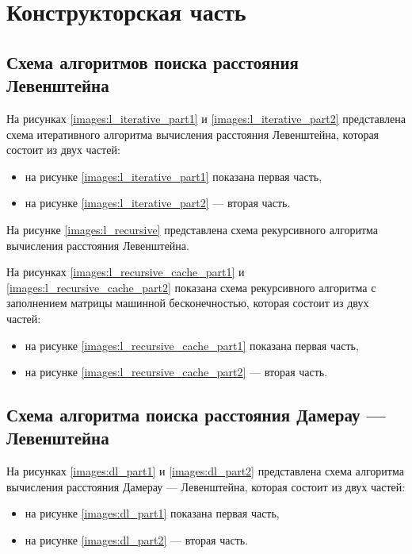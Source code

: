 \chapter{Конструкторская часть}

\section{Схема алгоритмов поиска расстояния Левенштейна}

На рисунках \ref{images:l_iterative_part1} и \ref{images:l_iterative_part2} представлена схема итеративного алгоритма вычисления расстояния Левенштейна, которая состоит из двух частей:

\begin{itemize}
\item на рисунке \ref{images:l_iterative_part1} показана первая часть,
\item на рисунке \ref{images:l_iterative_part2} — вторая часть.
\end{itemize}

\vspace{0.5cm}
На рисунке \ref{images:l_recursive} представлена схема рекурсивного алгоритма вычисления расстояния Левенштейна.

\vspace{0.5cm}
На рисунках \ref{images:l_recursive_cache_part1} и \ref{images:l_recursive_cache_part2} показана схема рекурсивного алгоритма с заполнением матрицы машинной бесконечностью, которая состоит из двух частей:

\begin{itemize}
\item на рисунке \ref{images:l_recursive_cache_part1} показана первая часть,
\item на рисунке \ref{images:l_recursive_cache_part2} — вторая часть.
\end{itemize}

\section{Схема алгоритма поиска расстояния Дамерау — Левенштейна}

На рисунках \ref{images:dl_part1} и \ref{images:dl_part2} представлена схема алгоритма вычисления расстояния Дамерау — Левенштейна, которая состоит из двух частей:

\begin{itemize}
\item на рисунке \ref{images:dl_part1} показана первая часть,
\item на рисунке \ref{images:dl_part2} — вторая часть.
\end{itemize}

